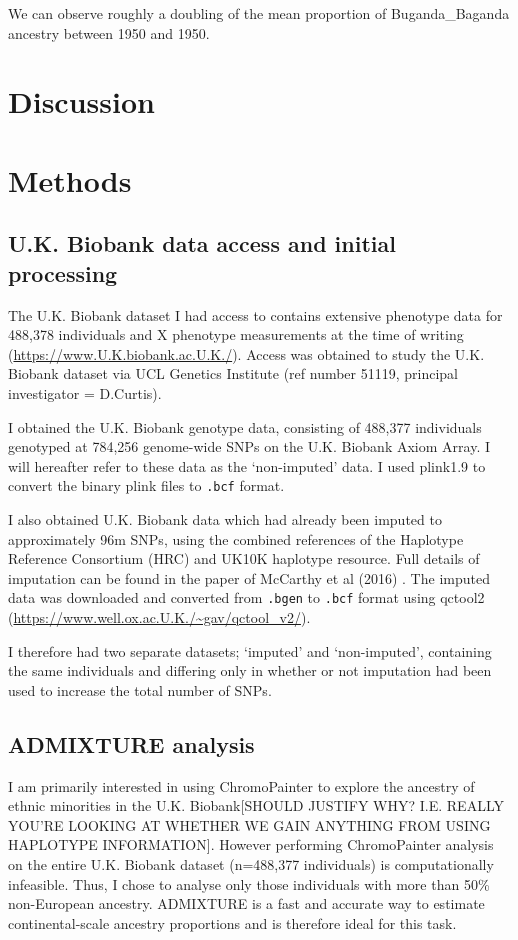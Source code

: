 We can observe roughly a doubling of the mean proportion of  Buganda\_Baganda ancestry between 1950 and 1950.

\section{Discussion} 

\section{Methods}

\subsection{U.K. Biobank data access and initial processing}

The U.K. Biobank dataset I had access to contains extensive phenotype data for 488,378 individuals and X phenotype measurements at the time of writing (\url{https://www.U.K.biobank.ac.U.K./}). Access was obtained to study the U.K. Biobank dataset via UCL Genetics Institute (ref number 51119, principal investigator = D.Curtis). 

I obtained the U.K. Biobank genotype data, consisting of 488,377 individuals genotyped at 784,256 genome-wide SNPs on the U.K. Biobank Axiom Array. I will hereafter refer to these data as the `non-imputed' data. I used plink1.9 \cite{purcell2007plink} to convert the binary plink files to \texttt{.bcf} format. 

I also obtained U.K. Biobank data which had already been imputed to approximately 96m SNPs, using the combined references of the Haplotype Reference Consortium (HRC) and UK10K haplotype resource. Full details of imputation can be found in the paper of McCarthy et al (2016) \cite{mccarthy2016reference}. The imputed data was downloaded and converted from \texttt{.bgen} to \texttt{.bcf} format using qctool2 (\url{https://www.well.ox.ac.U.K./~gav/qctool_v2/}). 

I therefore had two separate datasets; `imputed' and `non-imputed', containing the same individuals and differing only in whether or not imputation had been used to increase the total number of SNPs.

\subsection{ADMIXTURE analysis}

I am primarily interested in using ChromoPainter \cite{Lawson2012} to explore the ancestry of ethnic minorities in the U.K. Biobank{\color{red}[SHOULD JUSTIFY WHY? I.E. REALLY YOU'RE LOOKING AT WHETHER WE GAIN ANYTHING FROM USING HAPLOTYPE INFORMATION]}. However performing ChromoPainter analysis on the entire U.K. Biobank dataset (n=488,377 individuals) is computationally infeasible. Thus, I chose to analyse only those individuals with more than 50\% non-European ancestry. ADMIXTURE is a fast and accurate way to estimate continental-scale ancestry proportions \cite{alexander2009fast} and is therefore ideal for this task. 

